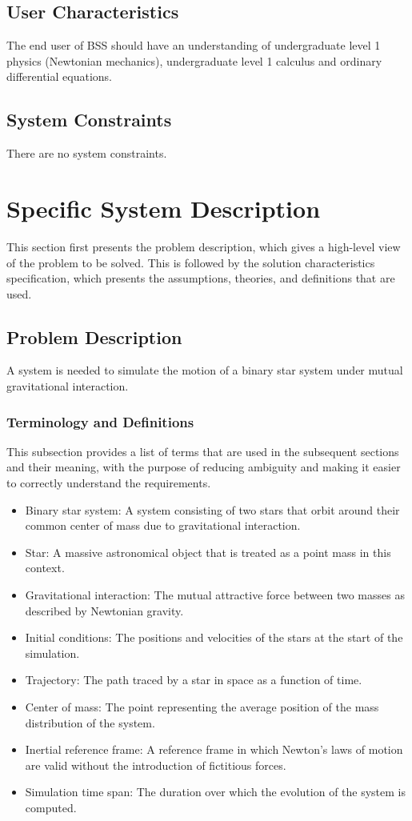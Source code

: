 \documentclass[12pt]{article}
\begin{document}
\subsection{User Characteristics}
\label{Sec:UserChars}
The end user of BSS should have an understanding of undergraduate level 1 physics (Newtonian mechanics), undergraduate level 1 calculus and ordinary differential equations.

\subsection{System Constraints}
\label{Sec:SysConstraints}
There are no system constraints.

\section{Specific System Description}
\label{Sec:SpecSystDesc}
This section first presents the problem description, which gives a high-level view of the problem to be solved. This is followed by the solution characteristics specification, which presents the assumptions, theories, and definitions that are used.

\subsection{Problem Description}
\label{Sec:ProbDesc}
A system is needed to simulate the motion of a binary star system under mutual gravitational interaction.

\subsubsection{Terminology and Definitions}
\label{Sec:TermDefs}
This subsection provides a list of terms that are used in the subsequent sections and their meaning, with the purpose of reducing ambiguity and making it easier to correctly understand the requirements.

\begin{itemize}
\item{Binary star system: A system consisting of two stars that orbit around their common center of mass due to gravitational interaction.}
\item{Star: A massive astronomical object that is treated as a point mass in this context.}
\item{Gravitational interaction: The mutual attractive force between two masses as described by Newtonian gravity.}
\item{Initial conditions: The positions and velocities of the stars at the start of the simulation.}
\item{Trajectory: The path traced by a star in space as a function of time.}
\item{Center of mass: The point representing the average position of the mass distribution of the system.}
\item{Inertial reference frame: A reference frame in which Newton's laws of motion are valid without the introduction of fictitious forces.}
\item{Simulation time span: The duration over which the evolution of the system is computed.}
\end{itemize}
\end{document}
